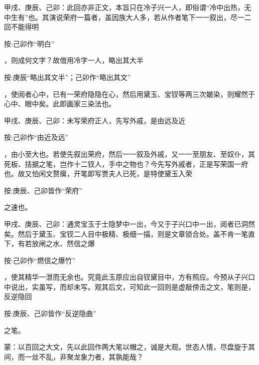 
\begin{parag}
    \begin{note}甲戌、庚辰、己卯：此回亦非正文，本旨只在冷子兴一人，即俗谓“冷中出热，无中生有”也。其演说荣府一篇者，盖因族大人多，若从作者笔下一一叙出，尽一二回不能得明\begin{subnote}按:己卯作“明白”\end{subnote}，则成何文字？故借用冷字一人，略出其大半\begin{subnote}按:庚辰“略出其文半”；己卯作“略出其文”\end{subnote}，使阅者心中，已有一荣府隐隐在心，然后用黛玉、宝钗等两三次皴染，则耀然于心中、眼中矣。此即画家三染法也。\end{note}
\end{parag}


\begin{parag}
    \begin{note}甲戌、庚辰、己卯：未写荣府正人，先写外戚，是由远及近\begin{subnote}按:己卯作“由近及远”\end{subnote}，由小至大也。若使先叙出荣府，然后一一叙及外戚，又一一至朋友、至奴仆，其死板、拮据之笔，岂作十二钗人，手中之物也？今先写外戚者，正是写荣国一府也。故又怕闲文赘瘰，开笔即写贾夫人已死，是特使黛玉入荣\begin{subnote}按:庚辰、己卯皆作“荣府”\end{subnote}之速也。\end{note}
\end{parag}


\begin{parag}
    \begin{note}甲戌、庚辰、己卯：通灵宝玉于士隐梦中一出，今又于子兴口中一出，阅者已洞然矣。然后于黛玉、宝钗二人目中极精、极细一描，则是文章锁合处。盖不肯一笔直下，有若放闸之水、然信之爆\begin{subnote}按:己卯作“燃信之爆竹”\end{subnote}，使其精华一泄而无余也。究竟此玉原应出自钗黛目中，方有照应。今预从子兴口中说出，实虽写，而却未写。观其后文，可知此一回则是虚敲傍击之文，笔则是，反逆隐回\begin{subnote}按:庚辰、己卯皆作“反逆隐曲”\end{subnote}之笔。\end{note}
\end{parag}


\begin{parag}
    \begin{note}蒙：以百回之大文，先以此回作两大笔以帽之，诚是大观。世态人情，尽盘旋于其间，而一丝不乱，非聚龙象力者，其孰能哉？\end{note}
\end{parag}


